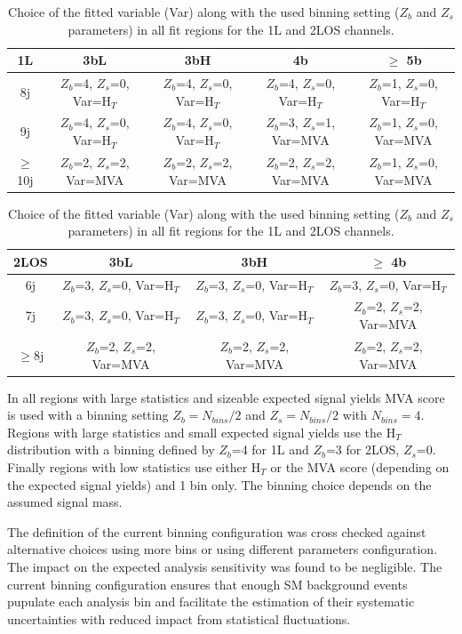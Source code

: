 \begin{table}
\begin{center}
\begin{tabular}{|c|c|c|c|c|} 
\hline
1L  &  3bL & 3bH & 4b & $\geq$ 5b\\ 
\hline
8j        &  $Z_{b}$=4,  $Z_{s}$=0, Var=H$_{T}$    &  $Z_{b}$=4,  $Z_{s}$=0, Var=H$_{T}$   &  $Z_{b}$=4,  $Z_{s}$=0, Var=H$_{T}$  & $Z_{b}$=1, $Z_{s}$=0, Var=H$_{T}$ \\
9j        &  $Z_{b}$=4,  $Z_{s}$=0, Var=H$_{T}$    &  $Z_{b}$=4,  $Z_{s}$=0, Var=H$_{T}$   &  $Z_{b}$=3,  $Z_{s}$=1, Var=MVA      &  $Z_{b}$=1,  $Z_{s}$=0, Var=MVA     \\
$\geq$10j &  $Z_{b}$=2,  $Z_{s}$=2, Var=MVA        &  $Z_{b}$=2,  $Z_{s}$=2, Var=MVA      &  $Z_{b}$=2,  $Z_{s}$=2, Var=MVA      &  $Z_{b}$=1,  $Z_{s}$=0, Var=MVA     \\
\hline
\end{tabular}

\begin{tabular}{|c|c|c|c|} 
\hline
2LOS  &  3bL & 3bH & $\geq$ 4b \\ 
\hline
6j        &  $Z_{b}$=3,  $Z_{s}$=0, Var=H$_{T}$     &  $Z_{b}$=3,  $Z_{s}$=0, Var=H$_{T}$   &  $Z_{b}$=3,  $Z_{s}$=0, Var=H$_{T}$  \\
7j        &  $Z_{b}$=3,  $Z_{s}$=0, Var=H$_{T}$     &  $Z_{b}$=3,  $Z_{s}$=0, Var=H$_{T}$   &  $Z_{b}$=2,  $Z_{s}$=2, Var=MVA      \\
$\geq$8j  &  $Z_{b}$=2,  $Z_{s}$=2, Var=MVA         &  $Z_{b}$=2,  $Z_{s}$=2, Var=MVA      &  $Z_{b}$=2,  $Z_{s}$=2, Var=MVA      \\
\hline
\end{tabular}

\caption{Choice of the fitted variable (Var) along with the used binning setting ($Z_{b}$ and $Z_{s}$ parameters) in all fit regions for the 1L and 2LOS channels.}
\label{tab:binning}
\end{center}
\end{table}

In all regions with large statistics and sizeable expected signal yields MVA score is used with a binning setting $Z_{b}=N_{bins}/2$ and $Z_{s}=N_{bins}/2$ with $N_{bins}=4$.  
Regions with large statistics and small expected signal yields use the H$_{T}$ distribution with a binning defined by $Z_{b}$=4 for 1L and $Z_{b}$=3 for 2LOS,  $Z_{s}$=0.
Finally regions with low statistics use either H$_{T}$ or the MVA score (depending on the expected signal yields) and 1 bin only. 
The binning choice depends on the assumed signal mass.

The definition of the current binning configuration was cross checked against alternative choices using more bins or using different parameters configuration. The impact on the expected analysis sensitivity was found to be negligible. The current binning configuration ensures that enough SM background events pupulate each analysis bin and facilitate the estimation of their systematic uncertainties with reduced impact from statistical fluctuations.  
